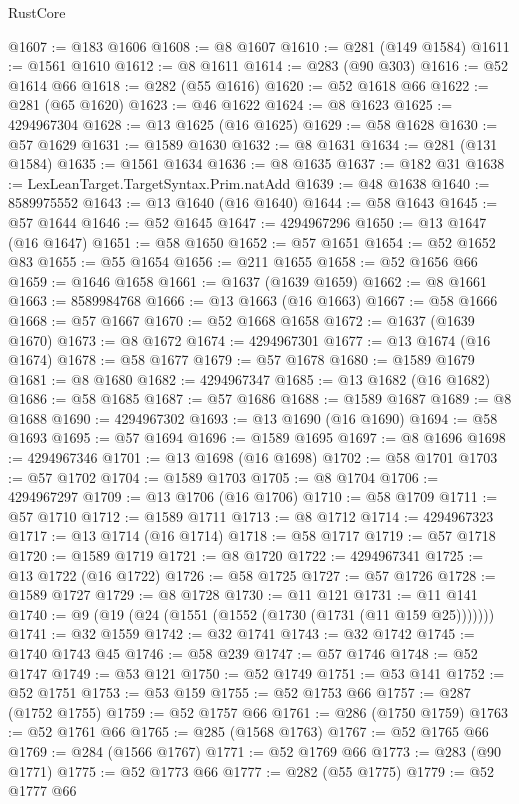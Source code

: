 \begin{lexlean}{RustCore}
\begin{coremodule}
@1607 := @183 @1606
@1608 := @8 @1607
@1610 := @281 (@149 @1584)
@1611 := @1561 @1610
@1612 := @8 @1611
@1614 := @283 (@90 @303)
@1616 := @52 @1614 @66
@1618 := @282 (@55 @1616)
@1620 := @52 @1618 @66
@1622 := @281 (@65 @1620)
@1623 := @46 @1622
@1624 := @8 @1623
@1625 := 4294967304
@1628 := @13 @1625 (@16 @1625)
@1629 := @58 @1628
@1630 := @57 @1629
@1631 := @1589 @1630
@1632 := @8 @1631
@1634 := @281 (@131 @1584)
@1635 := @1561 @1634
@1636 := @8 @1635
@1637 := @182 @31
@1638 := LexLeanTarget.TargetSyntax.Prim.natAdd
@1639 := @48 @1638
@1640 := 8589975552
@1643 := @13 @1640 (@16 @1640)
@1644 := @58 @1643
@1645 := @57 @1644
@1646 := @52 @1645
@1647 := 4294967296
@1650 := @13 @1647 (@16 @1647)
@1651 := @58 @1650
@1652 := @57 @1651
@1654 := @52 @1652 @83
@1655 := @55 @1654
@1656 := @211 @1655
@1658 := @52 @1656 @66
@1659 := @1646 @1658
@1661 := @1637 (@1639 @1659)
@1662 := @8 @1661
@1663 := 8589984768
@1666 := @13 @1663 (@16 @1663)
@1667 := @58 @1666
@1668 := @57 @1667
@1670 := @52 @1668 @1658
@1672 := @1637 (@1639 @1670)
@1673 := @8 @1672
@1674 := 4294967301
@1677 := @13 @1674 (@16 @1674)
@1678 := @58 @1677
@1679 := @57 @1678
@1680 := @1589 @1679
@1681 := @8 @1680
@1682 := 4294967347
@1685 := @13 @1682 (@16 @1682)
@1686 := @58 @1685
@1687 := @57 @1686
@1688 := @1589 @1687
@1689 := @8 @1688
@1690 := 4294967302
@1693 := @13 @1690 (@16 @1690)
@1694 := @58 @1693
@1695 := @57 @1694
@1696 := @1589 @1695
@1697 := @8 @1696
@1698 := 4294967346
@1701 := @13 @1698 (@16 @1698)
@1702 := @58 @1701
@1703 := @57 @1702
@1704 := @1589 @1703
@1705 := @8 @1704
@1706 := 4294967297
@1709 := @13 @1706 (@16 @1706)
@1710 := @58 @1709
@1711 := @57 @1710
@1712 := @1589 @1711
@1713 := @8 @1712
@1714 := 4294967323
@1717 := @13 @1714 (@16 @1714)
@1718 := @58 @1717
@1719 := @57 @1718
@1720 := @1589 @1719
@1721 := @8 @1720
@1722 := 4294967341
@1725 := @13 @1722 (@16 @1722)
@1726 := @58 @1725
@1727 := @57 @1726
@1728 := @1589 @1727
@1729 := @8 @1728
@1730 := @11 @121
@1731 := @11 @141
@1740 := @9 (@19 (@24 (@1551 (@1552 (@1730 (@1731 (@11 @159 @25)))))))
@1741 := @32 @1559
@1742 := @32 @1741
@1743 := @32 @1742
@1745 := @1740 @1743 @45
@1746 := @58 @239
@1747 := @57 @1746
@1748 := @52 @1747
@1749 := @53 @121
@1750 := @52 @1749
@1751 := @53 @141
@1752 := @52 @1751
@1753 := @53 @159
@1755 := @52 @1753 @66
@1757 := @287 (@1752 @1755)
@1759 := @52 @1757 @66
@1761 := @286 (@1750 @1759)
@1763 := @52 @1761 @66
@1765 := @285 (@1568 @1763)
@1767 := @52 @1765 @66
@1769 := @284 (@1566 @1767)
@1771 := @52 @1769 @66
@1773 := @283 (@90 @1771)
@1775 := @52 @1773 @66
@1777 := @282 (@55 @1775)
@1779 := @52 @1777 @66

\end{coremodule}
\end{lexlean}
